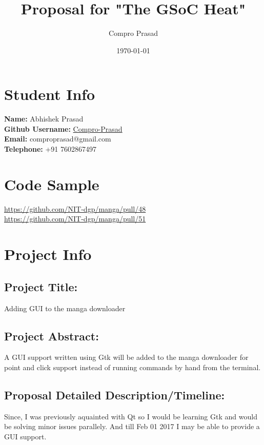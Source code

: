 \documentclass[11pt]{article}
\author{Compro Prasad}
\date{\today}
\title{Proposal for "The GSoC Heat"}
\begin{document}
\maketitle

\section{Student Info}
\label{sec:org070ba1a}
\textbf{Name:} Abhishek Prasad\\
\textbf{Github Username:} \href{https://github.com/Compro-Prasad}{Compro-Prasad}\\
\textbf{Email:} comproprasad@gmail.com\\
\textbf{Telephone:} +91 7602867497\\

\section{Code Sample}
\label{sec:orgebd57a9}

\url{https://github.com/NIT-dgp/manga/pull/48}\\
\url{https://github.com/NIT-dgp/manga/pull/51}

\section{Project Info}
\label{sec:org7a52ebb}

\subsection{Project Title:}
\label{sec:org8b10ab2}
Adding GUI to the manga downloader

\subsection{Project Abstract:}
\label{sec:org418d83d}
A GUI support written using Gtk will be added to the manga downloader
for point and click support instead of running commands by hand from
the terminal.

\subsection{Proposal Detailed Description/Timeline:}
\label{sec:org8caef49}
Since, I was previously aquainted with Qt so I would be learning Gtk and
would be solving minor issues parallely. And till Feb 01 2017 I may be able
to provide a GUI support.
\end{document}
